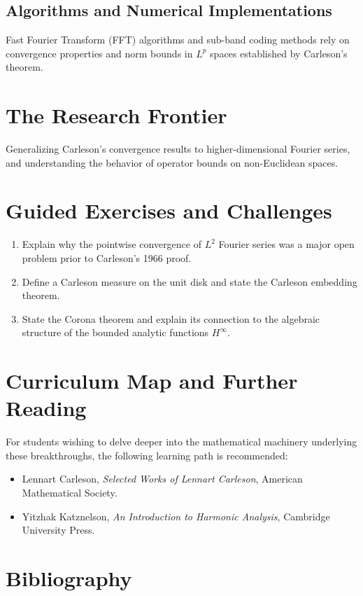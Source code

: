 \subsection{Algorithms and Numerical Implementations}
Fast Fourier Transform (FFT) algorithms and sub-band coding methods rely on convergence properties and norm bounds in $L^p$ spaces established by Carleson's theorem.

\section{The Research Frontier}
Generalizing Carleson's convergence results to higher-dimensional Fourier series, and understanding the behavior of operator bounds on non-Euclidean spaces.

\section{Guided Exercises and Challenges}
\begin{enumerate}[label=\textbf{\arabic*.}]
  \item Explain why the pointwise convergence of $L^2$ Fourier series was a major open problem prior to Carleson's 1966 proof.
  \item Define a Carleson measure on the unit disk and state the Carleson embedding theorem.
  \item State the Corona theorem and explain its connection to the algebraic structure of the bounded analytic functions $H^\infty$.
\end{enumerate}

\section{Curriculum Map and Further Reading}
For students wishing to delve deeper into the mathematical machinery underlying these breakthroughs, the following learning path is recommended:
\begin{itemize}
  \item Lennart Carleson, \emph{Selected Works of Lennart Carleson}, American Mathematical Society.
  \item Yitzhak Katznelson, \emph{An Introduction to Harmonic Analysis}, Cambridge University Press.
\end{itemize}

\section*{Bibliography}

